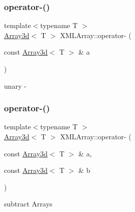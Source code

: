 \subsubsection{\texorpdfstring{operator-\/()}{operator-()}\hspace{0.1cm}{\footnotesize\ttfamily [1/8]}}
{\footnotesize\ttfamily template$<$typename T $>$ \\
\mbox{\hyperlink{classXMLArray_1_1Array3d}{Array3d}}$<$ T $>$ X\+M\+L\+Array\+::operator-\/ (\begin{DoxyParamCaption}\item[{const \mbox{\hyperlink{classXMLArray_1_1Array3d}{Array3d}}$<$ T $>$ \&}]{a }\end{DoxyParamCaption})\hspace{0.3cm}{\ttfamily [inline]}}



unary -\/ 

\mbox{\label{namespaceXMLArray_a84aa6790ab54770ccc98e82864af7d7b}} 
\subsubsection{\texorpdfstring{operator-\/()}{operator-()}\hspace{0.1cm}{\footnotesize\ttfamily [2/8]}}
{\footnotesize\ttfamily template$<$typename T $>$ \\
\mbox{\hyperlink{classXMLArray_1_1Array3d}{Array3d}}$<$ T $>$ X\+M\+L\+Array\+::operator-\/ (\begin{DoxyParamCaption}\item[{const \mbox{\hyperlink{classXMLArray_1_1Array3d}{Array3d}}$<$ T $>$ \&}]{a,  }\item[{const \mbox{\hyperlink{classXMLArray_1_1Array3d}{Array3d}}$<$ T $>$ \&}]{b }\end{DoxyParamCaption})\hspace{0.3cm}{\ttfamily [inline]}}



subtract Arrays 

\mbox{\label{namespaceXMLArray_afa891f2c8719af6106397c0e160656a3}} 
